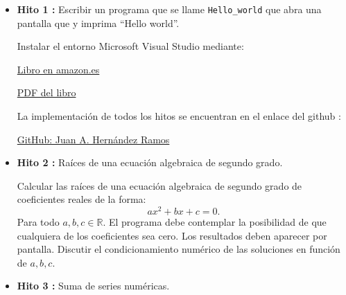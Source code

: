 \documentclass[12pt,spanish]{article}
\begin{document}
\begin{itemize}
	
	
\vspace{1cm}
\item {\bf Hito 1 :}
Escribir un programa que se llame \verb|Hello_world|  que
abra una pantalla que y imprima ``Hello world''. 

%
               
Instalar el entorno Microsoft Visual Studio  
mediante: 
  
  \color{red} 
 \begin{center} 
        \href{https://www.amazon.es/s?k=hernandez+rapado+moreno+visual&__mk_es_ES=AMAZON&ref=nb_sb_noss}
        {Libro en amazon.es}
        
        \href{https://github.com/jahrWork/Visual-Studio-projects/blob/master/doc/Manual_Visual_Studio_dic_2021.pdf}
             {PDF del libro} 
  \end{center} 
\color{black}   

La implementación de todos los hitos se encuentran en el enlace del github : 
 \color{red} 
 \begin{center} 
        \href{https://github.com/jahrWork/Informatics_S1_ETSIAE}{GitHub: Juan A. Hernández Ramos} 
  \end{center} 
\color{black}   


\vspace{1cm}
\item {\bf Hito 2 :}    Raíces de una ecuación algebraica de segundo grado. 

Calcular las raíces de una ecuación algebraica de segundo grado
de coeficientes reales de la forma: 
\begin{equation} 
a x^2 + b x + c = 0.
\label{ecuacion_segundo_grado}
\end{equation} 
Para todo  $a, b, c \in \mathbb{R}$.
El programa debe contemplar la posibilidad de que cualquiera de los coeficientes
sea cero. Los resultados deben aparecer por pantalla. Discutir el 
condicionamiento numérico de las soluciones en función de $a, b, c $. 
 


\item {\bf Hito 3 :}    Suma de series numéricas.                                                                              


\end{itemize}
\end{document}
